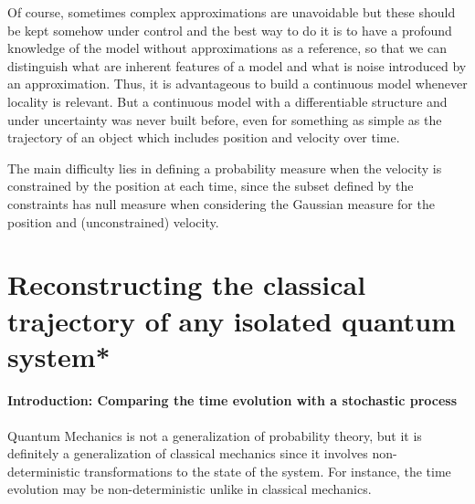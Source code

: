 \documentclass[11pt]{book}
\begin{document}
Of course, sometimes complex approximations are unavoidable but these
should be kept somehow under control and the best way to do it is to
have a profound knowledge of the model without approximations as a
reference, so that we can distinguish what are inherent features of a
model and what is noise introduced by an approximation. Thus, it is
advantageous to build a continuous model whenever locality is relevant.
But a continuous model with a differentiable structure and under
uncertainty was never built before, even for something as simple as the
trajectory of an object which includes position and velocity over time.

The main difficulty lies in defining a probability measure when the
velocity is constrained by the position at each time, since the subset
defined by the constraints has null measure when considering the
Gaussian measure for the position and (unconstrained) velocity.

\hypertarget{r7153331661}{%
\section*{}\label{r7153331661}}

\chapter{Reconstructing the classical trajectory of any isolated quantum system*}
\cite{door_probing_2025}\cite{nie_large_2025}\cite{noqrcy7buhz}

\hypertarget{introduction-comparing-the-time-evolution-with-a-stochastic-process}{%
\subsubsection{Introduction: Comparing the time evolution with a
stochastic
process}\label{introduction-comparing-the-time-evolution-with-a-stochastic-process}}

Quantum Mechanics is not a generalization of probability theory, but it
is definitely a generalization of classical mechanics since it involves
non-deterministic transformations to the state of the system. For
instance, the time evolution may be non-deterministic unlike in
classical mechanics.
\end{document}
